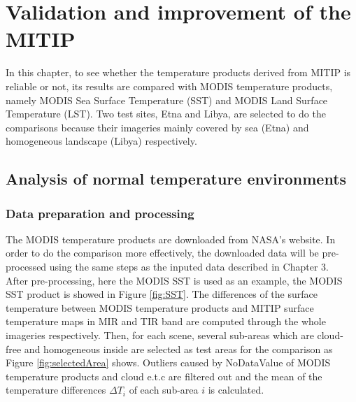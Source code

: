 \chapter{Validation and improvement of the MITIP}

\label{Chapter4}

In this chapter, to see whether the temperature products derived from MITIP is reliable or not, its results are compared with MODIS temperature products, namely MODIS Sea Surface Temperature (SST) and MODIS Land Surface Temperature (LST). Two test sites, Etna and Libya, are selected to do the comparisons because their imageries mainly covered by sea (Etna) and homogeneous landscape (Libya) respectively.\\


\section{Analysis of normal temperature environments}


\subsection{Data preparation and processing}
The MODIS temperature products are downloaded from NASA's website. In order to do the comparison more effectively, the downloaded data will be pre-processed using the same steps as the inputed data described in Chapter 3.\\

\noindent After pre-processing, here the MODIS SST is used as an example, the MODIS SST product is showed in Figure \ref{fig:SST}. The differences of the surface temperature between MODIS temperature products and MITIP surface temperature maps in MIR and TIR band are computed through the whole imageries respectively. Then, for each scene, several sub-areas which are cloud-free and homogeneous inside are selected as test areas for the comparison as Figure \ref{fig:selectedArea} shows. Outliers caused by NoDataValue of MODIS temperature products and cloud e.t.c are filtered out and the mean of the temperature differences $\Delta T_i$ of each sub-area $i$ is calculated.\\

